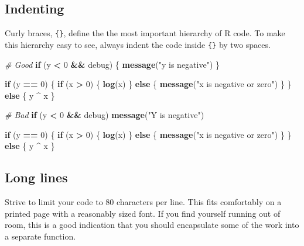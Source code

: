 \documentclass[]{book}
\newenvironment{Shaded}{\begin{snugshade}}{\end{snugshade}}
\newcommand{\KeywordTok}[1]{\textcolor[rgb]{0.13,0.29,0.53}{\textbf{#1}}}
\newcommand{\DecValTok}[1]{\textcolor[rgb]{0.00,0.00,0.81}{#1}}
\newcommand{\StringTok}[1]{\textcolor[rgb]{0.31,0.60,0.02}{#1}}
\newcommand{\CommentTok}[1]{\textcolor[rgb]{0.56,0.35,0.01}{\textit{#1}}}
\newcommand{\ControlFlowTok}[1]{\textcolor[rgb]{0.13,0.29,0.53}{\textbf{#1}}}
\newcommand{\OperatorTok}[1]{\textcolor[rgb]{0.81,0.36,0.00}{\textbf{#1}}}
\newcommand{\NormalTok}[1]{#1}
\begin{document}
\subsection{Indenting}\label{indenting}

Curly braces, \texttt{\{\}}, define the the most important hierarchy of
R code. To make this hierarchy easy to see, always indent the code
inside \texttt{\{\}} by two spaces.

\begin{Shaded}
\begin{Highlighting}[]
\CommentTok{# Good}
\ControlFlowTok{if}\NormalTok{ (y }\OperatorTok{<}\StringTok{ }\DecValTok{0} \OperatorTok{&&}\StringTok{ }\NormalTok{debug) \{}
  \KeywordTok{message}\NormalTok{(}\StringTok{"y is negative"}\NormalTok{)}
\NormalTok{\}}

\ControlFlowTok{if}\NormalTok{ (y }\OperatorTok{==}\StringTok{ }\DecValTok{0}\NormalTok{) \{}
  \ControlFlowTok{if}\NormalTok{ (x }\OperatorTok{>}\StringTok{ }\DecValTok{0}\NormalTok{) \{}
    \KeywordTok{log}\NormalTok{(x)}
\NormalTok{  \} }\ControlFlowTok{else}\NormalTok{ \{}
    \KeywordTok{message}\NormalTok{(}\StringTok{"x is negative or zero"}\NormalTok{)}
\NormalTok{  \}}
\NormalTok{\} }\ControlFlowTok{else}\NormalTok{ \{}
\NormalTok{  y }\OperatorTok{^}\StringTok{ }\NormalTok{x}
\NormalTok{\}}

\CommentTok{# Bad}
\ControlFlowTok{if}\NormalTok{ (y }\OperatorTok{<}\StringTok{ }\DecValTok{0} \OperatorTok{&&}\StringTok{ }\NormalTok{debug)}
\KeywordTok{message}\NormalTok{(}\StringTok{"Y is negative"}\NormalTok{)}

\ControlFlowTok{if}\NormalTok{ (y }\OperatorTok{==}\StringTok{ }\DecValTok{0}\NormalTok{)}
\NormalTok{\{}
    \ControlFlowTok{if}\NormalTok{ (x }\OperatorTok{>}\StringTok{ }\DecValTok{0}\NormalTok{) \{}
      \KeywordTok{log}\NormalTok{(x)}
\NormalTok{    \} }\ControlFlowTok{else}\NormalTok{ \{}
  \KeywordTok{message}\NormalTok{(}\StringTok{"x is negative or zero"}\NormalTok{)}
\NormalTok{    \}}
\NormalTok{\} }\ControlFlowTok{else}\NormalTok{ \{ y }\OperatorTok{^}\StringTok{ }\NormalTok{x \}}
\end{Highlighting}
\end{Shaded}

\subsection{Long lines}\label{long-lines}

Strive to limit your code to 80 characters per line. This fits
comfortably on a printed page with a reasonably sized font. If you find
yourself running out of room, this is a good indication that you should
encapsulate some of the work into a separate function.
\end{document}
